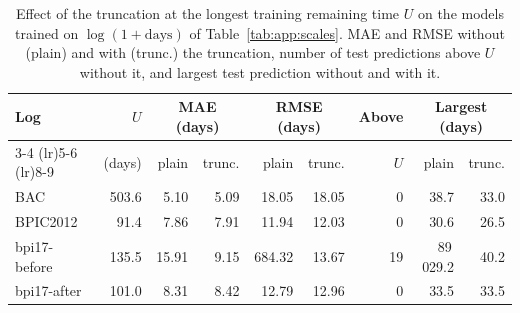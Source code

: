 \begin{table}[h]
  \centering
  \small
  \setlength{\tabcolsep}{4pt}
  \begin{tabular}{lrrrrrrrr}
    \toprule
    Log & $U$ & \multicolumn{2}{c}{MAE (days)} & \multicolumn{2}{c}{RMSE (days)}
        & Above & \multicolumn{2}{c}{Largest (days)} \\
    \cmidrule(lr){3-4} \cmidrule(lr){5-6} \cmidrule(lr){8-9}
        & (days) & plain & trunc. & plain & trunc. & $U$ & plain & trunc. \\
    \midrule
    BAC          & 503.6 &  5.10 & 5.09 &  18.05 & 18.05 &  0 &      38.7 & 33.0 \\
    BPIC2012     &  91.4 &  7.86 & 7.91 &  11.94 & 12.03 &  0 &      30.6 & 26.5 \\
    bpi17-before & 135.5 & 15.91 & 9.15 & 684.32 & 13.67 & 19 & 89\,029.2 & 40.2 \\
    bpi17-after  & 101.0 &  8.31 & 8.42 &  12.79 & 12.96 &  0 &      33.5 & 33.5 \\
    \bottomrule
  \end{tabular}
  \caption{Effect of the truncation at the longest training remaining time
    $U$ on the models trained on $\log(1 + \text{days})$ of
    Table~\ref{tab:app:scales}. MAE and RMSE without (plain) and with
    (trunc.) the truncation, number of test predictions above $U$ without
    it, and largest test prediction without and with it.}
  \label{tab:app:trunc}
\end{table}
